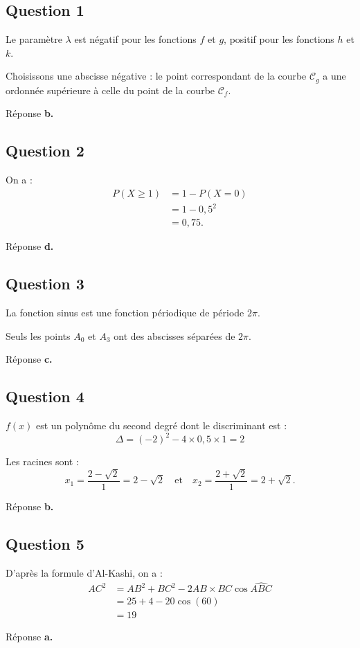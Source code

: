 \subsection*{Question 1}

Le paramètre \( \lambda \) est négatif pour les fonctions \(f\) et \(g\), positif pour les fonctions \(h\) et \(k\).

Choisissons une abscisse négative : le point correspondant de la courbe \(\mathcal{C}_g\) a une ordonnée supérieure à celle du point de la courbe \(\mathcal{C}_f\).

Réponse \textbf{b.}

\subsection*{Question 2}

On a :
\begin{align*}
P(X \geqslant 1) &= 1 - P(X = 0) \\
&= 1 - 0{,}5^2 \\
&= 0{,}75.
\end{align*}

Réponse \textbf{d.}

\subsection*{Question 3}

La fonction sinus est une fonction périodique de période \(2\pi\).

Seuls les points \(A_0\) et \(A_3\) ont des abscisses séparées de \(2\pi\).

Réponse \textbf{c.}

\subsection*{Question 4}

\( f(x) \) est un polynôme du second degré dont le discriminant est :
\[
\Delta = (-2)^2 - 4 \times 0{,}5 \times 1 = 2
\]

Les racines sont :
\[
x_1 = \dfrac{2 - \sqrt{2}}{1} = 2 - \sqrt{2} \quad \text{et} \quad x_2 = \dfrac{2 + \sqrt{2}}{1} = 2 + \sqrt{2}.
\]

Réponse \textbf{b.}

\subsection*{Question 5}

D'après la formule d'Al-Kashi, on a :
\begin{align*}
AC^2 &= AB^2 + BC^2 - 2AB \times BC \cos \widehat{ABC} \\
&= 25 + 4 - 20 \cos(60) \\
&= 19
\end{align*}

Réponse \textbf{a.}
